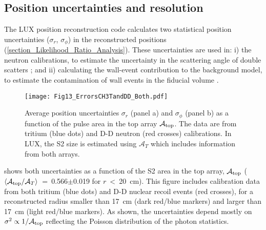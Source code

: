 \documentclass[a4paper,11pt]{article}
\begin{document}
\subsection{Position uncertainties and resolution\label{section_uncertainties}}

The LUX position reconstruction code calculates two statistical position uncertainties ($\sigma_r$, $\sigma_\phi$) in the reconstructed positions (\cref{section_Likelihood_Ratio_Analysis}). These uncertainties are used in: i) the neutron calibrations, to estimate the uncertainty in the scattering angle of double scatters \cite{LUX2016_DDCalibrations}; and ii) calculating the wall-event contribution to the background model, to estimate the contamination of wall events in the fiducial volume \cite{LUX2016_SSR}.

\begin{figure}
 \begin{center}
   \texttt{[image: Fig13\_ErrorsCH3TandDD\_Both.pdf]}%
\caption{ Average position uncertainties $\sigma_r$ (panel a) and $\sigma_\phi$ (panel b) as a function of the pulse area in the top array $\mathcal{A}_{\rm top}$. The data are from tritium (blue dots) and D-D neutron (red crosses) calibrations.  In LUX, the S2 size is estimated using $\mathcal{A}_{T}$ which includes information from both arrays.}
  \label{Fig21_ErrorsCH3andDD}
 \end{center}
\end{figure}

 shows both uncertainties as a function of the  S2 area in the top array, $\mathcal{A}_{\rm top}$ ($\left<\mathcal{A}_{\rm top}/\mathcal{A}_{T}\right>$~=~0.566$\pm$0.019 for $r$~<~20~cm). This figure includes calibration data from both tritium (blue dots) and D-D nuclear recoil events (red crosses), for a reconstructed radius smaller than 17~cm (dark red/blue markers) and larger than 17~cm (light red/blue markers). As shown, the uncertainties depend mostly on $\sigma^2\propto1/\mathcal{A}_{\rm top}$ reflecting the Poisson distribution of the photon statistics.  
\end{document}

